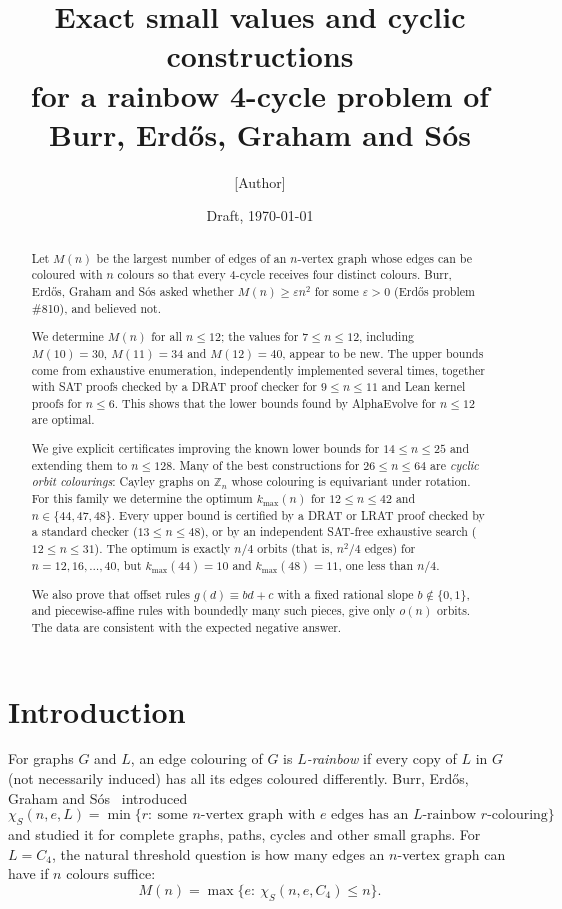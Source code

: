\documentclass[11pt]{amsart}
\title[Rainbow 4-cycles with $n$ colours]{Exact small values and cyclic constructions\\
for a rainbow 4-cycle problem of Burr, Erd\H{o}s, Graham and S\'os}
\author{[Author]}
\date{Draft, \today}
\theoremstyle{definition}
\newcommand{\Z}{\mathbb{Z}}
\newcommand{\M}{M}
\newcommand{\kmax}{k_{\max}}
\begin{document}
\begin{abstract}
Let $\M(n)$ be the largest number of edges of an $n$-vertex graph whose edges can be
coloured with $n$ colours so that every $4$-cycle receives four distinct colours.
Burr, Erd\H{o}s, Graham and S\'os asked whether $\M(n)\ge\varepsilon n^2$ for some
$\varepsilon>0$ (Erd\H{o}s problem \#810), and believed not.

We determine $\M(n)$ for all $n\le 12$; the values for $7\le n\le12$, including
$\M(10)=30$, $\M(11)=34$ and $\M(12)=40$, appear to be new. The upper bounds come from
exhaustive enumeration, independently implemented several times, together with SAT proofs
checked by a DRAT proof checker for $9\le n\le 11$ and Lean kernel proofs for $n\le 6$. This
shows that the lower bounds found by AlphaEvolve for $n\le 12$ are optimal.

We give explicit certificates improving the known lower bounds for $14\le n\le 25$ and
extending them to $n\le 128$. Many of the best constructions for $26\le n\le 64$ are
\emph{cyclic orbit colourings}: Cayley graphs on $\Z_n$ whose colouring is equivariant under
rotation. For this family we determine the optimum $\kmax(n)$ for $12\le n\le 42$ and
$n\in\{44,47,48\}$. Every upper bound is certified by a DRAT or LRAT proof checked by a
standard checker ($13\le n\le48$), or by an independent SAT-free exhaustive search
($12\le n\le31$). The optimum is exactly $n/4$ orbits (that is, $n^2/4$ edges) for
$n=12,16,\dots,40$, but $\kmax(44)=10$ and $\kmax(48)=11$, one less than $n/4$.

We also prove that offset rules $g(d)\equiv bd+c$ with a fixed rational slope
$b\notin\{0,1\}$, and piecewise-affine rules with boundedly many such pieces, give only $o(n)$
orbits. The data are consistent with the expected negative answer.
\end{abstract}

\maketitle

\section{Introduction}

For graphs $G$ and $L$, an edge colouring of $G$ is \emph{$L$-rainbow} if every copy of
$L$ in $G$ (not necessarily induced) has all its edges coloured differently. Burr,
Erd\H{o}s, Graham and S\'os~\cite{BEGS89} introduced
\[
  \chi_S(n,e,L)=\min\{r:\ \text{some $n$-vertex graph with $e$ edges has an $L$-rainbow $r$-colouring}\}
\]
and studied it for complete graphs, paths, cycles and other small graphs. For $L=C_4$, the
natural threshold question is how many edges an $n$-vertex graph can have if $n$ colours
suffice:
\[
  \M(n)=\max\{e:\ \chi_S(n,e,C_4)\le n\}.
\]
\end{document}
